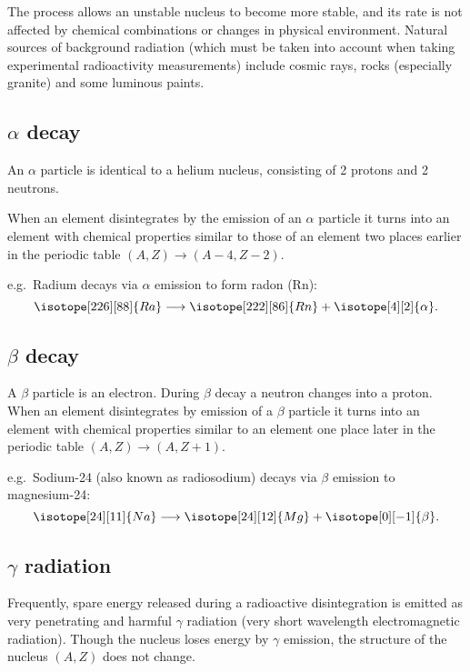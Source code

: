 The process allows an unstable nucleus to become more stable, and its rate is not affected by chemical combinations or changes in physical environment.  Natural sources of background radiation (which must be taken into account when taking experimental radioactivity measurements) include cosmic rays, rocks (especially granite) and some luminous paints.

\subsection{$\alpha$ decay}
An $\alpha$ particle is identical to a helium nucleus, consisting of 2 protons and 2 neutrons.

When an element disintegrates by the emission of an $\alpha$ particle it turns into an element with chemical properties similar to those of an element two places earlier in the periodic table $(A,Z)\rightarrow(A-4,Z-2)$.

e.g.\ Radium  decays via $\alpha$ emission to form radon (Rn):
\[\isotope[226][88]{Ra}\longrightarrow\isotope[222][86]{Rn}+\isotope[4][2]{\alpha}.\]

\subsection{$\beta$ decay}
A $\beta$ particle is an electron. During $\beta$ decay a neutron changes into a proton.  When an element disintegrates by emission of a $\beta$ particle it turns into an element with chemical properties similar to an element one place later in the periodic table $(A,Z)\rightarrow(A,Z+1)$. 

e.g.\  Sodium-24 (also known as radiosodium) decays via $\beta$ emission to magnesium-24:
\[\isotope[24][11]{Na}\longrightarrow\isotope[24][12]{Mg}+\isotope[0][-1]{\beta}.\]

\subsection{$\gamma$ radiation}

Frequently, spare energy released during a radioactive disintegration is emitted as very penetrating and harmful $\gamma$ radiation (very short wavelength electromagnetic radiation).  Though the nucleus loses energy by $\gamma$ emission, the structure of the nucleus $(A,Z)$ does not change.
